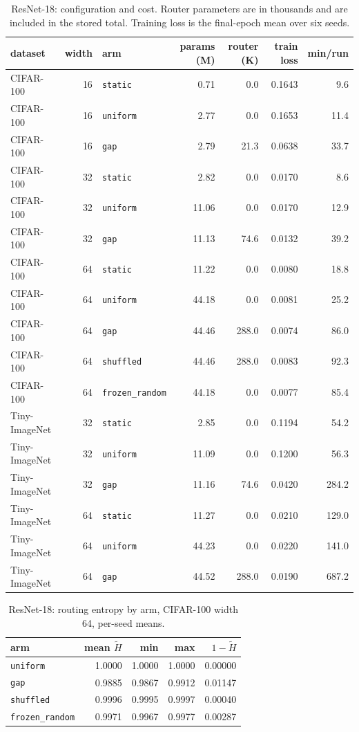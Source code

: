 \documentclass[10pt,a4paper]{article}
\begin{document}
\begin{table}[h]\centering\small
\caption{ResNet-18: configuration and cost. Router parameters are in thousands and
are included in the stored total. Training loss is the final-epoch mean
over six seeds.}
\label{tab:config}
\begin{tabular}{l r l rr r r}
\toprule
dataset & width & arm & params (M) & router (K) & train loss & min/run \\
\midrule
CIFAR-100 & 16 & \texttt{static} & 0.71 & 0.0 & 0.1643 & 9.6 \\
CIFAR-100 & 16 & \texttt{uniform} & 2.77 & 0.0 & 0.1653 & 11.4 \\
CIFAR-100 & 16 & \texttt{gap} & 2.79 & 21.3 & 0.0638 & 33.7 \\
CIFAR-100 & 32 & \texttt{static} & 2.82 & 0.0 & 0.0170 & 8.6 \\
CIFAR-100 & 32 & \texttt{uniform} & 11.06 & 0.0 & 0.0170 & 12.9 \\
CIFAR-100 & 32 & \texttt{gap} & 11.13 & 74.6 & 0.0132 & 39.2 \\
CIFAR-100 & 64 & \texttt{static} & 11.22 & 0.0 & 0.0080 & 18.8 \\
CIFAR-100 & 64 & \texttt{uniform} & 44.18 & 0.0 & 0.0081 & 25.2 \\
CIFAR-100 & 64 & \texttt{gap} & 44.46 & 288.0 & 0.0074 & 86.0 \\
CIFAR-100 & 64 & \texttt{shuffled} & 44.46 & 288.0 & 0.0083 & 92.3 \\
CIFAR-100 & 64 & \texttt{frozen\_random} & 44.18 & 0.0 & 0.0077 & 85.4 \\
Tiny-ImageNet & 32 & \texttt{static} & 2.85 & 0.0 & 0.1194 & 54.2 \\
Tiny-ImageNet & 32 & \texttt{uniform} & 11.09 & 0.0 & 0.1200 & 56.3 \\
Tiny-ImageNet & 32 & \texttt{gap} & 11.16 & 74.6 & 0.0420 & 284.2 \\
Tiny-ImageNet & 64 & \texttt{static} & 11.27 & 0.0 & 0.0210 & 129.0 \\
Tiny-ImageNet & 64 & \texttt{uniform} & 44.23 & 0.0 & 0.0220 & 141.0 \\
Tiny-ImageNet & 64 & \texttt{gap} & 44.52 & 288.0 & 0.0190 & 687.2 \\
\bottomrule
\end{tabular}
\end{table}

\begin{table}[h]\centering\small
\caption{ResNet-18: routing entropy by arm, CIFAR-100 width 64, per-seed
means.}
\label{tab:entw64}
\begin{tabular}{l rrr r}
\toprule
arm & mean $\tilde H$ & min & max & $1-\tilde H$ \\
\midrule
\texttt{uniform} & 1.0000 & 1.0000 & 1.0000 & 0.00000 \\
\texttt{gap} & 0.9885 & 0.9867 & 0.9912 & 0.01147 \\
\texttt{shuffled} & 0.9996 & 0.9995 & 0.9997 & 0.00040 \\
\texttt{frozen\_random} & 0.9971 & 0.9967 & 0.9977 & 0.00287 \\
\bottomrule
\end{tabular}
\end{table}
\end{document}

